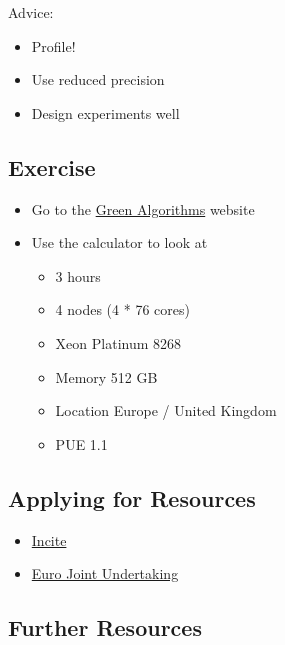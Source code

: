 \documentclass[
  letterpaper,
  DIV=11,
  numbers=noendperiod]{scrartcl}
\providecommand{\tightlist}{%
  \setlength{\itemsep}{0pt}\setlength{\parskip}{0pt}}
\begin{document}
Advice:

\begin{itemize}
\tightlist
\item
  Profile!
\item
  Use reduced precision
\item
  Design experiments well
\end{itemize}

\subsection{Exercise}\label{exercise}

\begin{itemize}
\tightlist
\item
  Go to the \href{https://www.green-algorithms.org/}{Green Algorithms}
  website
\item
  Use the calculator to look at

  \begin{itemize}
  \tightlist
  \item
    3 hours
  \item
    4 nodes (4 * 76 cores)
  \item
    Xeon Platinum 8268
  \item
    Memory 512 GB
  \item
    Location Europe / United Kingdom
  \item
    PUE 1.1
  \end{itemize}
\end{itemize}

\subsection{Applying for Resources}\label{applying-for-resources}

\begin{itemize}
\tightlist
\item
  \href{https://doeleadershipcomputing.org/}{Incite}
\item
  \href{https://eurohpc-ju.europa.eu/supercomputers/supercomputers-access-calls_en}{Euro
  Joint Undertaking}
\end{itemize}

\subsection{Further Resources}\label{further-resources}
\end{document}
